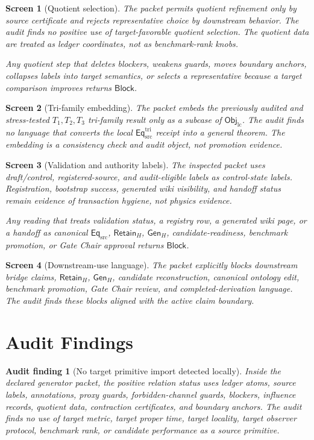\documentclass[11pt]{article}
\newcommand{\EqSrc}{\mathsf{Eq}_{\mathrm{src}}}
\newcommand{\EqTri}{\mathsf{Eq}_{\mathrm{src}}^{\mathrm{tri}}}
\newcommand{\ObjLC}{\mathsf{Obj}_{\mathrm{lc}}}
\newcommand{\RetainH}{\mathsf{Retain}_{H}}
\newcommand{\GenH}{\mathsf{Gen}_{H}}
\newcommand{\Block}{\mathsf{Block}}
\newtheorem{screen}{Screen}
\newtheorem{auditfinding}{Audit finding}
\begin{document}
\begin{screen}[Quotient selection]
The packet permits quotient refinement only by source certificate and
rejects representative choice by downstream behavior. The audit finds no
positive use of target-favorable quotient selection. The quotient data
are treated as ledger coordinates, not as benchmark-rank knobs.

Any quotient step that deletes blockers, weakens guards, moves boundary
anchors, collapses labels into target semantics, or selects a
representative because a target comparison improves returns \(\Block\).
\end{screen}

\begin{screen}[Tri-family embedding]
The packet embeds the previously audited and stress-tested
\(T_{1},T_{2},T_{3}\) tri-family result only as a subcase of \(\ObjLC\).
The audit finds no language that converts the local \(\EqTri\) receipt
into a general theorem. The embedding is a consistency check and audit
object, not promotion evidence.
\end{screen}

\begin{screen}[Validation and authority labels]
The inspected packet uses draft/control, registered-source, and
audit-eligible labels as control-state labels. Registration, bootstrap
success, generated wiki visibility, and handoff status remain evidence
of transaction hygiene, not physics evidence.

Any reading that treats validation status, a registry row, a generated
wiki page, or a handoff as canonical \(\EqSrc\), \(\RetainH\),
\(\GenH\), candidate-readiness, benchmark promotion, or Gate Chair
approval returns \(\Block\).
\end{screen}

\begin{screen}[Downstream-use language]
The packet explicitly blocks downstream bridge claims, \(\RetainH\),
\(\GenH\), candidate reconstruction, canonical ontology edit, benchmark
promotion, Gate Chair review, and completed-derivation language. The
audit finds these blocks aligned with the active claim boundary.
\end{screen}

\section{Audit Findings}

\begin{auditfinding}[No target primitive import detected locally]
Inside the declared generator packet, the positive relation status uses
ledger atoms, source labels, annotations, proxy guards,
forbidden-channel guards, blockers, influence records, quotient data,
contraction certificates, and boundary anchors. The audit finds no use
of target metric, target proper time, target locality, target observer
protocol, benchmark rank, or candidate performance as a source
primitive.
\end{auditfinding}
\end{document}
